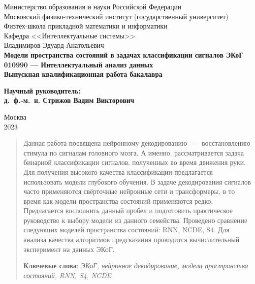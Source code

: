 \documentclass[a4paper, 12pt]{article}
\begin{document}
	
	\thispagestyle{empty}
	\begin{center}
		\sc
		Министерство образования и науки Российской Федерации\\
		Московский физико-технический институт
		{\rm(государственный университет)}\\
		Физтех-школа прикладной математики и информатики\\
		Кафедра <<Интеллектуальные системы>>\\[35mm]
		\rm\large
		Владимиров Эдуард Анатольевич\\[10mm]
		\bf\Large
		Модели пространства состояний в задачах классификации сигналов ЭКоГ \\[10mm]
		\rm\normalsize
		010990 --- Интеллектуальный анализ данных\\[10mm]
		\sc
		Выпускная квалификационная работа бакалавра\\[10mm]
	\end{center}
	\hfill\parbox{80mm}{
		\begin{flushleft}
			\bf
			Научный руководитель:\\
			\rm
			д.~ф.-м.~н. Стрижов Вадим Викторович\\[5cm]
		\end{flushleft}
	}
	\begin{center}
		Москва\\
		2023
	\end{center}
	
	\newpage
	\tableofcontents
	\newpage
	
	\begin{abstract}
		Данная работа посвящена нейронному декодированию ~--- восстановлению стимула по сигналам головного мозга. А именно, рассматривается задача бинарной классификации сигналов, полученных во время движения руки. Для получения высокого качества классификации предлагается использовать модели глубокого обучения. В задаче декодирования сигналов часто применяются свёрточные нейронные сети и трансформеры, в то время как модели пространства состояний применяются редко. Предлагается восполнить данный пробел и подготовить практическое руководство к выбору модели из данного семейства. Проведено сравнение следующих моделей пространства состояний: RNN, NCDE, S4. Для анализа качества алгоритмов предсказания проводится вычислительный эксперимент на данных ЭКоГ.
		
		\bigskip
		\textbf{Ключевые слова}: \emph{ЭКоГ, нейронное декодирование, модели пространства состояний, RNN, S4, NCDE}
	\end{abstract}
	
\end{document}
